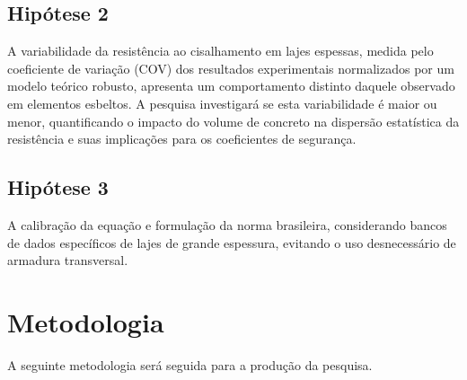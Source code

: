 \section{Hipótese 2}
A variabilidade da resistência ao cisalhamento em lajes espessas, medida pelo coeficiente de variação (COV) dos resultados experimentais normalizados por um modelo teórico robusto, apresenta um comportamento distinto daquele observado em elementos esbeltos. A pesquisa investigará se esta variabilidade é maior ou menor, quantificando o impacto do volume de concreto na dispersão estatística da resistência e suas implicações para os coeficientes de segurança. 
\section{Hipótese 3}
A calibração da equação e formulação da norma brasileira, considerando bancos de dados específicos de lajes de grande espessura, evitando o uso desnecessário de armadura transversal.

\chapter{Metodologia}
A seguinte metodologia será seguida para a produção da pesquisa.

